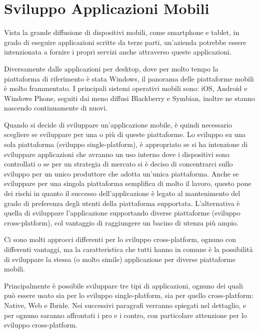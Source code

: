 \chapter{Sviluppo Applicazioni Mobili}
	Vista la grande diffusione di dispositivi mobili, come smartphone e tablet, 
	in grado di eseguire applicazioni scritte da terze parti, un'azienda 
	potrebbe essere intenzionata a fornire i propri servizi anche attraverso 
	queste applicazioni.
	
	Diversamente dalle applicazioni per desktop, dove per molto tempo la 
	piattaforma di riferimento è stata Windows, il panorama delle piattaforme 
	mobili è molto frammentato. I principali sistemi operativi mobili sono: iOS, 
	Android e Windows Phone, seguiti dai meno diffusi Blackberry e Symbian, 
	inoltre ne stanno nascendo continuamente di nuovi.
	
	Quando si decide di sviluppare un'applicazione mobile, è quindi necessario 
	scegliere se sviluppare per una o più di queste piattaforme. Lo sviluppo su 
	una sola piattaforma (sviluppo single-platform), è appropriato se si ha 
	intenzione di sviluppare applicazioni che avranno un uso interno dove i 
	dispositivi sono controllati o se per un strategia di mercato si è deciso di 
	concentrarci sullo sviluppo per un unico produttore che adotta un'unica 
	piattaforma. Anche se sviluppare per una singola piattaforma semplifica di 
	molto il lavoro, questo pone dei rischi in quanto il successo 
	dell'applicazione è legato al mantenimento del grado di preferenza degli 
	utenti della piattaforma supportata. L'alternativa è quella di sviluppare 
	l'applicazione supportando diverse piattaforme (sviluppo cross-platform), 
	col vantaggio di raggiungere un bacino di utenza più ampio.
	
	Ci sono molti approcci differenti per lo sviluppo cross-platform, ognuno con 
	differenti vantaggi, ma la caratteristica che tutti hanno in comune è la 
	possibilità di sviluppare la stessa (o molto simile) applicazione per 
	diverse piattaforme mobili.
	 
	Principalmente è possibile sviluppare tre tipi di applicazioni, ognuno dei 
	quali può essere usato sia per lo sviluppo single-platform, sia per quello 
	cross-platform: Native, Web e Ibride. Nei successivi paragrafi 
	verranno spiegati nel dettaglio, e per ognuno saranno affrontati i pro e i 
	contro, con particolare attenzione per lo sviluppo cross-platform.
	
